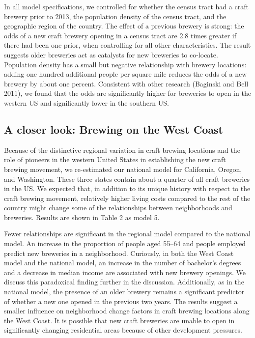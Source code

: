 \documentclass[]{article}
\begin{document}
In all model specifications, we controlled for whether the census tract
had a craft brewery prior to 2013, the population density of the census
tract, and the geographic region of the country. The effect of a
previous brewery is strong: the odds of a new craft brewery opening in a
census tract are 2.8 times greater if there had been one prior, when
controlling for all other characteristics. The result suggests older
breweries act as catalysts for new breweries to co-locate. Population
density has a small but negative relationship with brewery locations:
adding one hundred additional people per square mile reduces the odds of
a new brewery by about one percent. Consistent with other research
(Baginski and Bell 2011), we found that the odds are significantly
higher for breweries to open in the western US and significantly lower
in the southern US.

\subsection{A closer look: Brewing on the West
Coast}\label{a-closer-look-brewing-on-the-west-coast}

Because of the distinctive regional variation in craft brewing locations
and the role of pioneers in the western United States in establishing
the new craft brewing movement, we re-estimated our national model for
California, Oregon, and Washington. These three states contain about a
quarter of all craft breweries in the US. We expected that, in addition
to its unique history with respect to the craft brewing movement,
relatively higher living costs compared to the rest of the country might
change some of the relationships between neighborhoods and breweries.
Results are shown in Table 2 as model 5.

Fewer relationships are significant in the regional model compared to
the national model. An increase in the proportion of people aged 55--64
and people employed predict new breweries in a neighborhood. Curiously,
in both the West Coast model and the national model, an increase in the
number of bachelor's degrees and a decrease in median income are
associated with new brewery openings. We discuss this paradoxical
finding further in the discussion. Additionally, as in the national
model, the presence of an older brewery remains a significant predictor
of whether a new one opened in the previous two years. The results
suggest a smaller influence on neighborhood change factors in craft
brewing locations along the West Coast. It is possible that new craft
breweries are unable to open in significantly changing residential areas
because of other development pressures.
\end{document}
